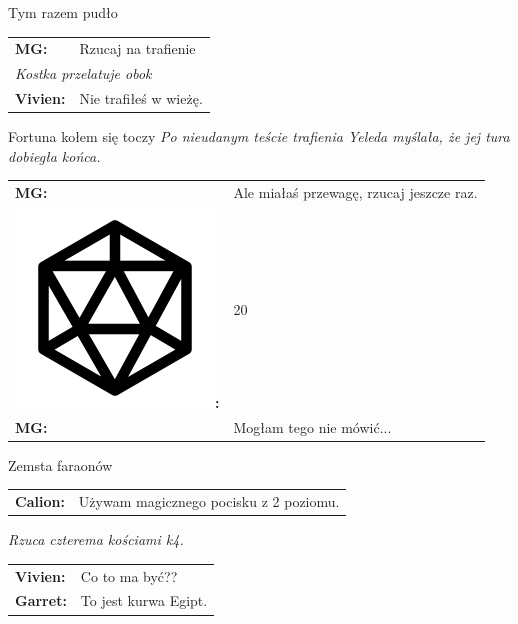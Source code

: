 \documentclass[10pt,twoside,twocolumn]{book}
\begin{document}
\begin{rpg-quotebox}{Tym razem pudło}
   \begin{tabularx}{\columnwidth}{lX}
      \textbf{MG:} & Rzucaj na trafienie\\
      \multicolumn{2}{l}{\textit{Kostka przelatuje obok}} \\
      \textbf{Vivien:} & Nie trafiłeś w wieżę.\\
   \end{tabularx}
\end{rpg-quotebox}

\begin{rpg-quotebox}{Fortuna kołem się toczy}
   \textit{Po nieudanym teście trafienia Yeleda myślała, że jej tura dobiegła końca.}\\

   \vskip-0.05cm
   \begin{tabularx}{\columnwidth}{lX}
      \textbf{MG:} & Ale miałaś przewagę, rzucaj jeszcze raz.\\
      \includegraphics[scale=0.06]{img/d20.png}\textbf{:}& 20\\
      \textbf{MG:} & Mogłam tego nie mówić...\\
   \end{tabularx}
\end{rpg-quotebox}


\begin{rpg-quotebox}{Zemsta faraonów}
   \begin{tabularx}{\columnwidth}{lX}
      \textbf{Calion:} & Używam magicznego pocisku z 2 poziomu.\\ 
   \end{tabularx}

   \vskip0.15cm
   \textit{Rzuca czterema kościami k4.} \\
   
   \begin{tabularx}{\columnwidth}{lX}
      \textbf{Vivien:} & Co to ma być??\\
      \textbf{Garret:} & To jest kurwa Egipt.
   \end{tabularx}
\end{rpg-quotebox}
\end{document}
